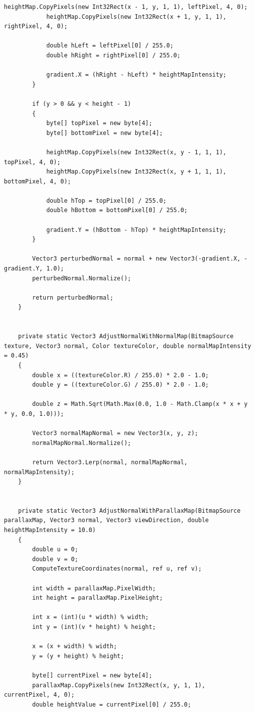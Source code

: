 \begin{lstlisting}[caption={Класс RayTracingService}, label={lst:3-5}]
			heightMap.CopyPixels(new Int32Rect(x - 1, y, 1, 1), leftPixel, 4, 0);
			heightMap.CopyPixels(new Int32Rect(x + 1, y, 1, 1), rightPixel, 4, 0);
			
			double hLeft = leftPixel[0] / 255.0;
			double hRight = rightPixel[0] / 255.0;
			
			gradient.X = (hRight - hLeft) * heightMapIntensity;
		}
		
		if (y > 0 && y < height - 1)
		{
			byte[] topPixel = new byte[4];
			byte[] bottomPixel = new byte[4];
			
			heightMap.CopyPixels(new Int32Rect(x, y - 1, 1, 1), topPixel, 4, 0);
			heightMap.CopyPixels(new Int32Rect(x, y + 1, 1, 1), bottomPixel, 4, 0);
			
			double hTop = topPixel[0] / 255.0;
			double hBottom = bottomPixel[0] / 255.0;
			
			gradient.Y = (hBottom - hTop) * heightMapIntensity;
		}
		
		Vector3 perturbedNormal = normal + new Vector3(-gradient.X, -gradient.Y, 1.0);
		perturbedNormal.Normalize();
		
		return perturbedNormal;
	}
	
	
	private static Vector3 AdjustNormalWithNormalMap(BitmapSource texture, Vector3 normal, Color textureColor, double normalMapIntensity = 0.45)
	{
		double x = ((textureColor.R) / 255.0) * 2.0 - 1.0;
		double y = ((textureColor.G) / 255.0) * 2.0 - 1.0;
		
		double z = Math.Sqrt(Math.Max(0.0, 1.0 - Math.Clamp(x * x + y * y, 0.0, 1.0)));
		
		Vector3 normalMapNormal = new Vector3(x, y, z);
		normalMapNormal.Normalize();
		
		return Vector3.Lerp(normal, normalMapNormal, normalMapIntensity);
	}
	
	
	private static Vector3 AdjustNormalWithParallaxMap(BitmapSource parallaxMap, Vector3 normal, Vector3 viewDirection, double heightMapIntensity = 10.0)
	{
		double u = 0;
		double v = 0;
		ComputeTextureCoordinates(normal, ref u, ref v);
		
		int width = parallaxMap.PixelWidth;
		int height = parallaxMap.PixelHeight;
		
		int x = (int)(u * width) % width;
		int y = (int)(v * height) % height;
		
		x = (x + width) % width;
		y = (y + height) % height;
		
		byte[] currentPixel = new byte[4];
		parallaxMap.CopyPixels(new Int32Rect(x, y, 1, 1), currentPixel, 4, 0);
		double heightValue = currentPixel[0] / 255.0;
		

\end{lstlisting}
